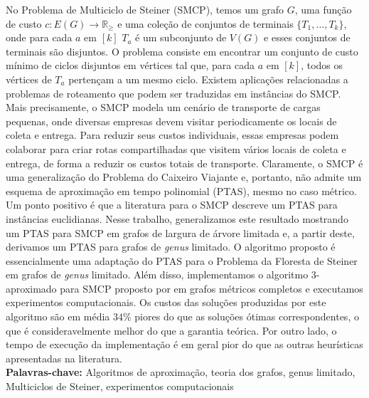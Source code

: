 
No Problema de Multiciclo de Steiner (SMCP), temos um grafo \(G\), uma função de custo $c \colon E(G) \to \mathbb{R}_\ge$ e uma coleção de conjuntos de terminais \(\{T_1, \dots , T_k\}\), onde para cada \(a\) em \([k]\) \(T_a\) é um subconjunto de \(V(G)\) e esses conjuntos de terminais são disjuntos. O problema consiste em encontrar um conjunto de custo mínimo de ciclos disjuntos em vértices tal que, para cada \(a\) em \([k]\), todos os vértices de \(T_a\) pertençam a um mesmo ciclo.
Existem aplicações relacionadas a problemas de roteamento que podem ser traduzidas em instâncias do SMCP.
Mais precisamente, o SMCP modela um cenário de transporte de cargas pequenas, onde diversas empresas devem visitar periodicamente os locais de coleta e entrega.
Para reduzir seus custos individuais, essas empresas podem colaborar para criar rotas compartilhadas que visitem vários locais de coleta e entrega, de forma a reduzir os custos totais de transporte.
Claramente, o SMCP é uma generalização do Problema do Caixeiro Viajante e, portanto, não admite um esquema de aproximação em tempo polinomial (PTAS), mesmo no caso métrico.
Um ponto positivo é que a literatura para o SMCP descreve um PTAS para instâncias euclidianas. Nesse trabalho, generalizamos este resultado mostrando um PTAS para SMCP em grafos de largura de árvore limitada e, a partir deste, derivamos um PTAS para grafos de \textit{genus} limitado.
O algoritmo proposto é essencialmente uma adaptação do PTAS para o Problema da Floresta de Steiner em grafos de \textit{genus} limitado.
Além disso, implementamos o algoritmo 3-aproximado para SMCP proposto por \cite{smcp_3apx} em grafos métricos completos e executamos experimentos computacionais.
Os custos das soluções produzidas por este algoritmo são em média \(34\%\) piores do que as soluções ótimas correspondentes, o que é consideravelmente melhor do que a garantia teórica.
Por outro lado, o tempo de execução da implementação é em geral pior do que as outras heurísticas apresentadas na literatura.
\hfill\\

\noindent\textbf{Palavras-chave:} Algoritmos de aproximação, teoria dos grafos, genus limitado, Multiciclos de Steiner, experimentos computacionais
